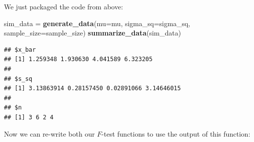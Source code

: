 \documentclass[
]{book}
\newenvironment{Shaded}{\begin{snugshade}}{\end{snugshade}}
\newcommand{\AttributeTok}[1]{\textcolor[rgb]{0.13,0.29,0.53}{#1}}
\newcommand{\ControlFlowTok}[1]{\textcolor[rgb]{0.13,0.29,0.53}{\textbf{#1}}}
\newcommand{\FunctionTok}[1]{\textcolor[rgb]{0.13,0.29,0.53}{\textbf{#1}}}
\newcommand{\NormalTok}[1]{#1}
\newcommand{\OtherTok}[1]{\textcolor[rgb]{0.56,0.35,0.01}{#1}}
\newcommand{\SpecialCharTok}[1]{\textcolor[rgb]{0.81,0.36,0.00}{\textbf{#1}}}
\begin{document}
\begin{Shaded}
\end{Shaded}

We just packaged the code from above:

\begin{Shaded}
\begin{Highlighting}[]
\NormalTok{sim\_data }\OtherTok{=} \FunctionTok{generate\_data}\NormalTok{(}\AttributeTok{mu=}\NormalTok{mu, }\AttributeTok{sigma\_sq=}\NormalTok{sigma\_sq, }\AttributeTok{sample\_size=}\NormalTok{sample\_size)}
\FunctionTok{summarize\_data}\NormalTok{(sim\_data)}
\end{Highlighting}
\end{Shaded}

\begin{verbatim}
## $x_bar
## [1] 1.259348 1.930630 4.041589 6.323205
## 
## $s_sq
## [1] 3.13863914 0.28157450 0.02891066 3.14646015
## 
## $n
## [1] 3 6 2 4
\end{verbatim}

Now we can re-write both our \(F\)-test functions to use the output of this function:
\end{document}
